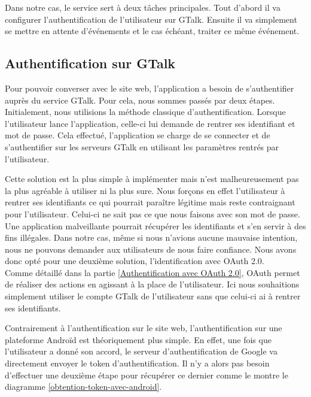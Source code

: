 Dans notre cas, le service sert à deux tâches principales. Tout d'abord il va configurer l'authentification
de l'utilisateur sur GTalk. Ensuite il va simplement se mettre en attente d'événements et le cas échéant, 
traiter ce même événement.



\subsection{Authentification sur GTalk}

Pour pouvoir converser avec le site web, l'application a besoin de s'authentifier auprès du service
GTalk. Pour cela, nous sommes passés par deux étapes. 
\\


Initialement, nous utilisions la méthode classique d'authentification. Lorsque l'utilisateur lance 
l'application, celle-ci lui demande de rentrer ses identifiant et mot de passe. Cela effectué, 
l'application se charge de se connecter et de s'authentifier sur les serveurs GTalk en utilisant les
paramètres rentrés par l'utilisateur.

Cette solution est la plus simple à implémenter mais n'est malheureusement pas la plus agréable
à utiliser ni la plus sure. Nous forçons en effet l'utilisateur à rentrer ses identifiants ce qui 
pourrait paraître légitime mais reste contraignant pour l'utilisateur. Celui-ci ne sait pas ce que 
nous faisons avec son mot de passe. Une application malveillante pourrait récupérer les identifiants
et s'en servir à des fins illégales. Dans notre cas, même si nous n'avions aucune mauvaise intention,
nous ne pouvons demander aux utilisateurs de nous faire confiance. Nous avons donc opté pour une 
deuxième solution, l'identification avec OAuth 2.0.
\\


Comme détaillé dans la partie \ref{Authentification avec OAuth 2.0}, OAuth permet de réaliser des actions en agissant à la place de l'utilisateur. 
Ici nous souhaitions simplement utiliser le compte GTalk de l'utilisateur sans que celui-ci ai à rentrer
ses identifiants. 

Contrairement à l'authentification sur le site web, l'authentification sur une plateforme Androïd est
théoriquement plus simple. En effet, une fois que l'utilisateur a donné son accord, le serveur 
d'authentification de Google va directement envoyer le token d'authentification. Il n'y a alors pas 
besoin d'effectuer une deuxième étape pour récupérer ce dernier comme le montre le diagramme 
\ref{obtention-token-avec-android}.

